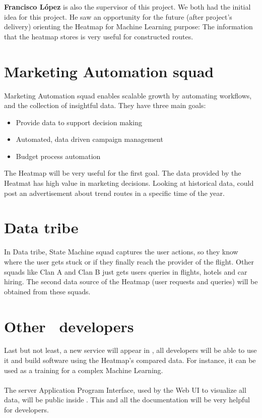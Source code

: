 \textbf{Francisco López} is also the supervisor of this project. We both had the initial idea for this project. He saw an opportunity for the future (after project's delivery) orienting the Heatmap for Machine Learning purpose: The information that the heatmap stores is very useful for constructed routes.

\section{Marketing Automation squad} \label{mas}

Marketing Automation squad enables scalable growth by automating workflows, and the collection of insightful data. They have three main goals:

\begin{itemize}
  \item Provide data to support decision making
  \item Automated, data driven campaign management
  \item Budget process automation
\end{itemize}

The Heatmap will be very useful for the first goal. The data provided by the Heatmat has high value in marketing decisions. Looking at historical data,  could post an advertisement about trend routes in a specific time of the year.

\section{Data tribe}

In Data tribe, State Machine squad captures the user actions, so they know where the user gets stuck or if they finally reach the provider of the flight. Other squads like Clan A and Clan B just gets users queries in flights, hotels and car hiring. The second data source of the Heatmap (user requests and queries) will be obtained from these squads.

\section{Other \company\ developers}

Last but not least, a new service will appear in \company, all developers will be able to use it and build software using the Heatmap's compared data. For instance, it can be used as a training for a complex Machine Learning\cite{machine_learning_coursera}.
\\\\
The server Application Program Interface, used by the Web UI to visualize all data, will be public inside \company. This and all the documentation will be very helpful for developers.

